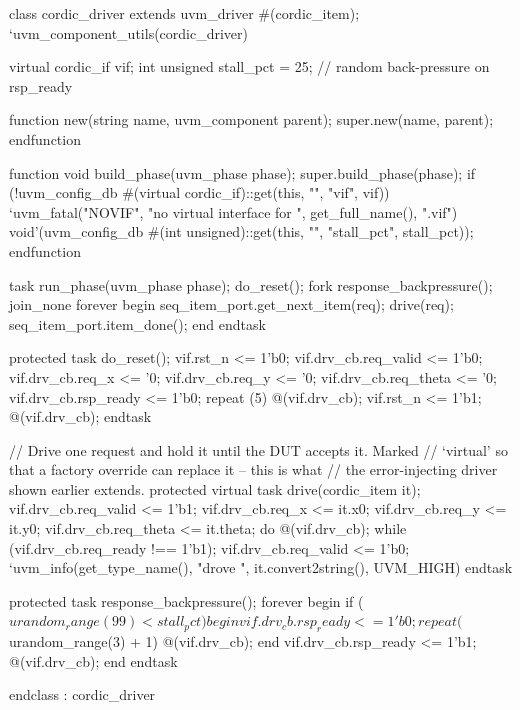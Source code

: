 \begin{uvmcode}[caption={\code{cordic\_driver}: replaces \code{cordic\_drv}},label={lst:uvm:drv}]
  class cordic_driver extends uvm_driver #(cordic_item);
    `uvm_component_utils(cordic_driver)

    virtual cordic_if vif;
    int unsigned      stall_pct = 25;   // random back-pressure on rsp_ready

    function new(string name, uvm_component parent);
      super.new(name, parent);
    endfunction

    function void build_phase(uvm_phase phase);
      super.build_phase(phase);
      if (!uvm_config_db #(virtual cordic_if)::get(this, "", "vif", vif))
        `uvm_fatal("NOVIF",
                   {"no virtual interface for ", get_full_name(), ".vif"})
      void'(uvm_config_db #(int unsigned)::get(this, "", "stall_pct",
                                               stall_pct));
    endfunction

    task run_phase(uvm_phase phase);
      do_reset();
      fork
        response_backpressure();
      join_none
      forever begin
        seq_item_port.get_next_item(req);
        drive(req);
        seq_item_port.item_done();
      end
    endtask

    protected task do_reset();
      vif.rst_n            <= 1'b0;
      vif.drv_cb.req_valid <= 1'b0;
      vif.drv_cb.req_x     <= '0;
      vif.drv_cb.req_y     <= '0;
      vif.drv_cb.req_theta <= '0;
      vif.drv_cb.rsp_ready <= 1'b0;
      repeat (5) @(vif.drv_cb);
      vif.rst_n <= 1'b1;
      @(vif.drv_cb);
    endtask

    // Drive one request and hold it until the DUT accepts it.  Marked
    // `virtual' so that a factory override can replace it -- this is what
    // the error-injecting driver shown earlier extends.
    protected virtual task drive(cordic_item it);
      vif.drv_cb.req_valid <= 1'b1;
      vif.drv_cb.req_x     <= it.x0;
      vif.drv_cb.req_y     <= it.y0;
      vif.drv_cb.req_theta <= it.theta;
      do @(vif.drv_cb); while (vif.drv_cb.req_ready !== 1'b1);
      vif.drv_cb.req_valid <= 1'b0;
      `uvm_info(get_type_name(),
                {"drove ", it.convert2string()}, UVM_HIGH)
    endtask

    protected task response_backpressure();
      forever begin
        if ($urandom_range(99) < stall_pct) begin
          vif.drv_cb.rsp_ready <= 1'b0;
          repeat ($urandom_range(3) + 1) @(vif.drv_cb);
        end
        vif.drv_cb.rsp_ready <= 1'b1;
        @(vif.drv_cb);
      end
    endtask

  endclass : cordic_driver
\end{uvmcode}

